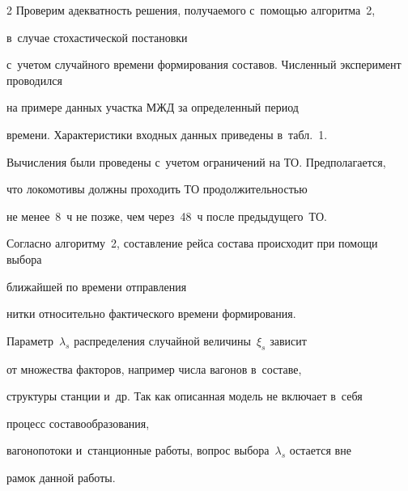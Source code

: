 \begin{multicols}{2}
Проверим адекватность решения, получаемого с~помощью алгоритма~2, 


в~случае стохастической постановки


с~учетом случайного времени формирования составов. Численный эксперимент проводился 


на примере данных участка МЖД за определенный период 


времени. Характеристики входных данных приведены в~табл.~1.











Вычисления были проведены с~учетом ограничений на ТО. Предполагается, 


что локомотивы должны проходить ТО продолжительностью


не менее~8~ч не позже, чем через~48~ч после предыду\-ще\-го~ТО.






























Согласно алгоритму~2, составление рейса состава происходит при помощи выбора 


ближайшей по времени отправления


нитки относительно фактического времени формирования.


Параметр~$\lambda_s$ распределения случайной величины~$\xi_s$ зависит 


от множества факторов, например числа вагонов в~составе,


структуры станции и~др. Так как описанная модель не включает в~себя 


процесс составообразования,


вагонопотоки и~станционные работы, вопрос выбора~$\lambda_s$ остается вне 


рамок данной работы.\linebreak\vspace*{-12pt}









\end{multicols}
